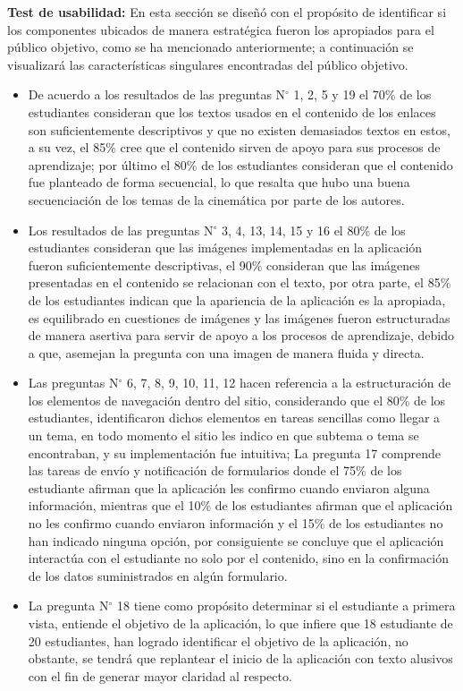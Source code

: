 \textbf{Test de usabilidad:} En esta sección se diseñó con el propósito de identificar si los componentes ubicados de manera estratégica fueron los apropiados para el público objetivo, como se ha mencionado anteriormente; a continuación se visualizará las características singulares encontradas del público objetivo.
\begin{itemize}

\item De acuerdo a los resultados de las preguntas N$^{\circ}$ 1, 2, 5 y 19 el 70\% de los estudiantes consideran que los textos usados en el contenido de los enlaces son suficientemente descriptivos y que no existen demasiados textos en estos, a su vez, el 85\% cree que el contenido sirven de apoyo para sus procesos de aprendizaje; por último el 80\% de los estudiantes consideran que el contenido fue planteado de forma secuencial, lo que resalta que hubo una buena secuenciación de los temas de la cinemática por parte de los autores. 

\item Los resultados de las preguntas N$^{\circ}$ 3, 4, 13, 14, 15 y 16 el 80\% de los estudiantes consideran que las imágenes implementadas en la aplicación fueron suficientemente descriptivas, el 90\% consideran que las imágenes presentadas en el contenido se relacionan con el texto, por otra parte, el 85\% de los estudiantes indican que la apariencia de la aplicación es la apropiada, es equilibrado en cuestiones de imágenes y  las imágenes fueron estructuradas de manera asertiva para servir de apoyo a los procesos de aprendizaje, debido a que, asemejan la pregunta con una imagen de manera fluida y directa.

\item Las preguntas N$^{\circ}$ 6, 7, 8, 9, 10, 11, 12 hacen referencia a la estructuración de los elementos de navegación dentro del sitio, considerando que el 80\% de los estudiantes, identificaron dichos elementos en tareas sencillas como llegar a un tema, en todo momento el sitio les indico en que subtema o tema se encontraban, y su implementación fue intuitiva; La pregunta 17 comprende las tareas de envío y notificación de formularios donde el 75\% de los estudiante afirman que la aplicación les confirmo cuando enviaron alguna información, mientras que el 10\% de los estudiantes afirman que el aplicación no les confirmo cuando enviaron información y el 15\% de los estudiantes no han indicado ninguna opción, por consiguiente se concluye que el aplicación interactúa con el estudiante no solo por el contenido, sino en la confirmación de los datos suministrados en algún formulario.

\item La pregunta N$^{\circ}$ 18 tiene como propósito determinar si el estudiante a primera vista, entiende el objetivo de la aplicación, lo que infiere que 18 estudiante de 20 estudiantes, han logrado identificar el objetivo de la aplicación, no obstante, se tendrá que replantear el inicio de la aplicación con texto alusivos con el fin de generar mayor claridad al respecto.

\end{itemize}

